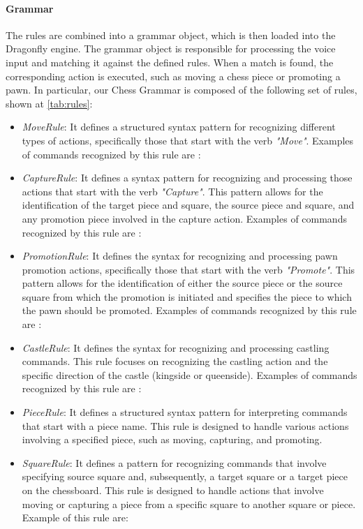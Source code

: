 \documentclass[a4paper, 11pt, twocolumn]{IEEEtran}
\begin{document}
    \paragraph*{Grammar} The rules are combined into a grammar object, which is then loaded into the Dragonfly engine. The grammar object is responsible for processing the voice input and matching it against the defined rules. When a match is found, the corresponding action is executed, such as moving a chess piece or promoting a pawn. In particular, our Chess Grammar is composed of the following set of rules, shown at \ref{tab:rules}: 
    \begin{itemize}
        \item \textit{MoveRule}: It defines a structured syntax pattern for recognizing different types of actions, specifically those that start with the verb \emph{"Move"}. Examples of commands recognized by this rule are : 
        \item \textit{CaptureRule}:  It defines a syntax pattern for recognizing and processing those actions that start with the verb \emph{"Capture"}. This pattern allows for the identification of the target piece and square, the source piece and square, and any promotion piece involved in the capture action. Examples of commands recognized by this rule are : 
        \item \textit{PromotionRule}:  It defines the syntax for recognizing and processing pawn promotion actions, specifically those that start with the verb \emph{"Promote"}. This pattern allows for the identification of either the source piece or the source square from which the promotion is initiated and specifies the piece to which the pawn should be promoted. Examples of commands recognized by this rule are : 
        \item \textit{CastleRule}: It defines the syntax for recognizing and processing castling commands. This rule focuses on recognizing the castling action and the specific direction of the castle (kingside or queenside). Examples of commands recognized by this rule are :
        \item \textit{PieceRule}: It defines a structured syntax pattern for interpreting commands that start with a piece name. This rule is designed to handle various actions involving a specified piece, such as moving, capturing, and promoting.
        \item \textit{SquareRule}: It defines a pattern for recognizing commands that involve specifying source square and, subsequently, a target square or a target piece on the chessboard. This rule is designed to handle actions that involve moving or capturing a piece from a specific square to another square or piece. Example of this rule are: 
    \end{itemize} 
\end{document}
